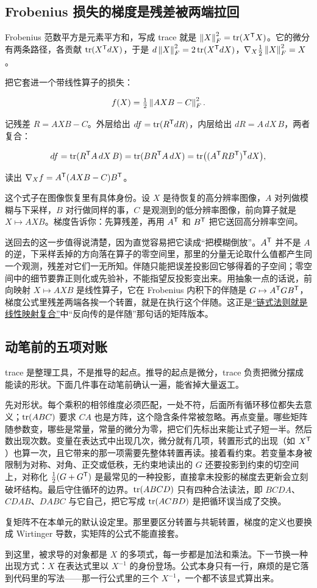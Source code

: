 \subsection{Frobenius 损失的梯度是残差被两端拉回}

Frobenius 范数平方是元素平方和，写成 trace 就是 \(\left\lVert X\right\rVert_F^2=\operatorname{tr}(X^{\mathsf{T}}X)\)。它的微分有两条路径，各贡献 \(\operatorname{tr}(X^{\mathsf{T}}dX)\)，于是 \(d\left\lVert X\right\rVert_F^2=2\operatorname{tr}(X^{\mathsf{T}}dX)\)，\(\nabla_X\tfrac12\left\lVert X\right\rVert_F^2=X\)。

把它套进一个带线性算子的损失：

\[
f(X)=\tfrac12\left\lVert AXB-C\right\rVert_F^2.
\]

记残差 \(R=AXB-C\)。外层给出 \(df=\operatorname{tr}(R^{\mathsf{T}}dR)\)，内层给出 \(dR=A\,dX\,B\)，两者复合：

\[
df=\operatorname{tr}(R^{\mathsf{T}}A\,dX\,B)=\operatorname{tr}(BR^{\mathsf{T}}A\,dX)
=\operatorname{tr}\bigl((A^{\mathsf{T}}RB^{\mathsf{T}})^{\mathsf{T}}dX\bigr),
\]

读出 \(\nabla_X f=A^{\mathsf{T}}(AXB-C)B^{\mathsf{T}}\)。

这个式子在图像恢复里有具体身份。设 \(X\) 是待恢复的高分辨率图像，\(A\) 对列做模糊与下采样，\(B\) 对行做同样的事，\(C\) 是观测到的低分辨率图像，前向算子就是 \(X\mapsto AXB\)。梯度告诉你：先算残差，再用 \(A^{\mathsf{T}}\) 和 \(B^{\mathsf{T}}\) 把它送回高分辨率空间。

送回去的这一步值得说清楚，因为直觉容易把它读成``把模糊倒放''。\(A^{\mathsf{T}}\) 并不是 \(A\) 的逆，下采样丢掉的方向落在算子的零空间里，那里的分量无论取什么值都产生同一个观测，残差对它们一无所知。伴随只能把误差投影回它够得着的子空间；零空间中的细节要靠正则化或先验补，不能指望反投影变出来。用抽象一点的话说，前向映射 \(X\mapsto AXB\) 是线性算子，它在 Frobenius 内积下的伴随是 \(G\mapsto A^{\mathsf{T}}GB^{\mathsf{T}}\)，梯度公式里残差两端各挨一个转置，就是在执行这个伴随。这正是\hyperref[sec:10-Matrix-Calculus/02-Differentials/02]{``链式法则就是线性映射复合''}中``反向传的是伴随''那句话的矩阵版本。

\subsection{动笔前的五项对账}

trace 是整理工具，不是推导的起点。推导的起点是微分，trace 负责把微分摆成能读的形状。下面几件事在动笔前确认一遍，能省掉大量返工。

先对形状。每个乘积的相邻维度必须匹配，一处不符，后面所有循环移位都失去意义；\(\operatorname{tr}(ABC)\) 要求 \(CA\) 也是方阵，这个隐含条件常被忽略。再点变量。哪些矩阵随参数变，哪些是常量，常量的微分为零，把它们先标出来能让式子短一半。然后数出现次数。变量在表达式中出现几次，微分就有几项，转置形式的出现（如 \(X^{\mathsf{T}}\)）也算一次，且它带来的那一项需要先整体转置再读。接着看约束。若变量本身被限制为对称、对角、正交或低秩，无约束地读出的 \(G\) 还要投影到约束的切空间上，对称化 \(\tfrac12(G+G^{\mathsf{T}})\) 是最常见的一种投影，直接拿未投影的梯度去更新会立刻破坏结构。最后守住循环的边界。\(\operatorname{tr}(ABCD)\) 只有四种合法读法，即 \(BCDA\)、\(CDAB\)、\(DABC\) 与它自己，把它写成 \(\operatorname{tr}(ACBD)\) 是把循环误当成了交换。

复矩阵不在本单元的默认设定里。那里要区分转置与共轭转置，梯度的定义也要换成 Wirtinger 导数，实矩阵的公式不能直接套。

到这里，被求导的对象都是 \(X\) 的多项式，每一步都是加法和乘法。下一节换一种出现方式：\(X\) 在表达式里以 \(X^{-1}\) 的身份登场。公式本身只有一行，麻烦的是它落到代码里的写法——那一行公式里的三个 \(X^{-1}\)，一个都不该显式算出来。
